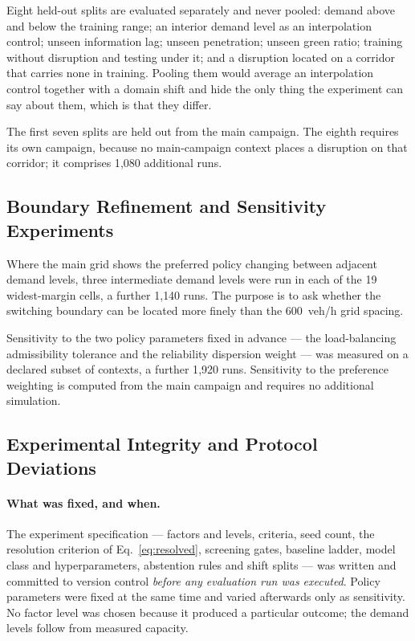 \documentclass[runningheads]{llncs}
\begin{document}
Eight held-out splits are evaluated separately and never pooled: demand above
and below the training range; an interior demand level as an interpolation
control; unseen information lag; unseen penetration; unseen green ratio;
training without disruption and testing under it; and a disruption located on a
corridor that carries none in training. Pooling them would average an
interpolation control together with a domain shift and hide the only thing the
experiment can say about them, which is that they differ.

The first seven splits are held out from the main campaign. The eighth requires
its own campaign, because no main-campaign context places a disruption on that
corridor; it comprises 1{,}080 additional runs.

\subsection{Boundary Refinement and Sensitivity Experiments}

Where the main grid shows the preferred policy changing between adjacent demand
levels, three intermediate demand levels were run in each of the 19
widest-margin cells, a further 1{,}140 runs. The purpose is to ask
whether the switching boundary can be located more finely than the
600~veh/h grid spacing.

Sensitivity to the two policy parameters fixed in advance --- the
load-balancing admissibility tolerance and the reliability dispersion weight ---
was measured on a declared subset of contexts, a further 1{,}920 runs.
Sensitivity to the preference weighting is computed from the main campaign and
requires no additional simulation.

\subsection{Experimental Integrity and Protocol Deviations}
\label{sec:integrity}

\paragraph{What was fixed, and when.} The experiment specification --- factors
and levels, criteria, seed count, the resolution criterion of
Eq.~\ref{eq:resolved}, screening gates, baseline ladder, model class and
hyperparameters, abstention rules and shift splits --- was written and committed
to version control \emph{before any evaluation run was executed}. Policy
parameters were fixed at the same time and varied afterwards only as
sensitivity. No factor level was chosen because it produced a particular
outcome; the demand levels follow from measured capacity.
\end{document}
